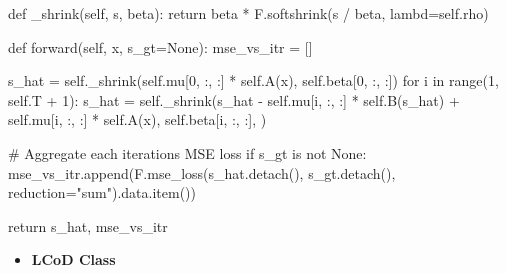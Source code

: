 \documentclass[
  letterpaper,
  DIV=11,
  numbers=noendperiod]{scrartcl}
\newenvironment{Shaded}{\begin{snugshade}}{\end{snugshade}}
\newcommand{\BuiltInTok}[1]{\textcolor[rgb]{0.40,0.85,0.94}{#1}}
\newcommand{\CommentTok}[1]{\textcolor[rgb]{0.46,0.44,0.37}{#1}}
\newcommand{\ControlFlowTok}[1]{\textcolor[rgb]{0.98,0.15,0.45}{#1}}
\newcommand{\DecValTok}[1]{\textcolor[rgb]{0.68,0.51,1.00}{#1}}
\newcommand{\KeywordTok}[1]{\textcolor[rgb]{0.98,0.15,0.45}{#1}}
\newcommand{\NormalTok}[1]{\textcolor[rgb]{0.97,0.97,0.95}{#1}}
\newcommand{\OperatorTok}[1]{\textcolor[rgb]{0.97,0.97,0.95}{#1}}
\newcommand{\StringTok}[1]{\textcolor[rgb]{0.90,0.86,0.45}{#1}}
\newcommand{\VariableTok}[1]{\textcolor[rgb]{0.97,0.97,0.95}{#1}}
\providecommand{\tightlist}{%
  \setlength{\itemsep}{0pt}\setlength{\parskip}{0pt}}
\begin{document}
\begin{Shaded}
\begin{Highlighting}[]
    \KeywordTok{def}\NormalTok{ \_shrink(}\VariableTok{self}\NormalTok{, s, beta):}
        \ControlFlowTok{return}\NormalTok{ beta }\OperatorTok{*}\NormalTok{ F.softshrink(s }\OperatorTok{/}\NormalTok{ beta, lambd}\OperatorTok{=}\VariableTok{self}\NormalTok{.rho)}

    \KeywordTok{def}\NormalTok{ forward(}\VariableTok{self}\NormalTok{, x, s\_gt}\OperatorTok{=}\VariableTok{None}\NormalTok{):}
\NormalTok{        mse\_vs\_itr }\OperatorTok{=}\NormalTok{ []}

\NormalTok{        s\_hat }\OperatorTok{=} \VariableTok{self}\NormalTok{.\_shrink(}\VariableTok{self}\NormalTok{.mu[}\DecValTok{0}\NormalTok{, :, :] }\OperatorTok{*} \VariableTok{self}\NormalTok{.A(x), }\VariableTok{self}\NormalTok{.beta[}\DecValTok{0}\NormalTok{, :, :])}
        \ControlFlowTok{for}\NormalTok{ i }\KeywordTok{in} \BuiltInTok{range}\NormalTok{(}\DecValTok{1}\NormalTok{, }\VariableTok{self}\NormalTok{.T }\OperatorTok{+} \DecValTok{1}\NormalTok{):}
\NormalTok{            s\_hat }\OperatorTok{=} \VariableTok{self}\NormalTok{.\_shrink(s\_hat }\OperatorTok{{-}} \VariableTok{self}\NormalTok{.mu[i, :, :] }\OperatorTok{*} \VariableTok{self}\NormalTok{.B(s\_hat) }\OperatorTok{+} \VariableTok{self}\NormalTok{.mu[i, :, :] }\OperatorTok{*} \VariableTok{self}\NormalTok{.A(x),}
                                 \VariableTok{self}\NormalTok{.beta[i, :, :], )}
            
            \CommentTok{\# Aggregate each iteration\textquotesingle{}s MSE loss}
            \ControlFlowTok{if}\NormalTok{ s\_gt }\KeywordTok{is} \KeywordTok{not} \VariableTok{None}\NormalTok{:}
\NormalTok{                mse\_vs\_itr.append(F.mse\_loss(s\_hat.detach(), s\_gt.detach(), reduction}\OperatorTok{=}\StringTok{"sum"}\NormalTok{).data.item())}

        \ControlFlowTok{return}\NormalTok{ s\_hat, mse\_vs\_itr}
\end{Highlighting}
\end{Shaded}

\begin{itemize}
\tightlist
\item
  \textbf{LCoD Class}
\end{itemize}
\end{document}
